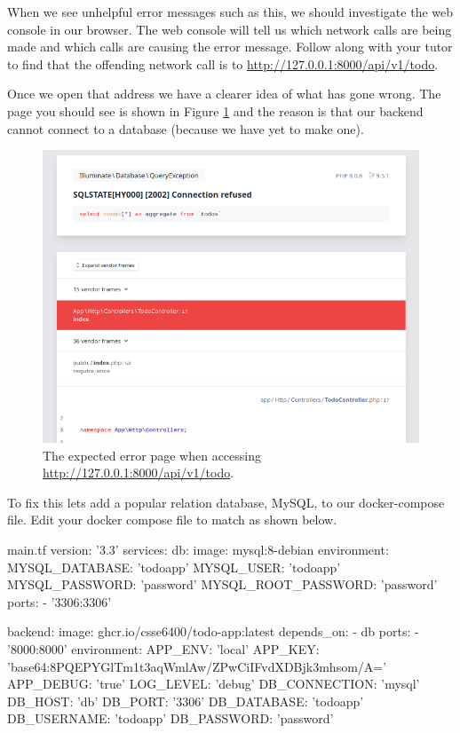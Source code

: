 \documentclass{csse4400}
\begin{document}
When we see unhelpful error messages such as this,
we should investigate the web console in our browser.
The web console will tell us which network calls are being made and which calls are causing the error message.
Follow along with your tutor to find that the offending network call is to \url{http://127.0.0.1:8000/api/v1/todo}.

Once we open that address we have a clearer idea of what has gone wrong.
The page you should see is shown in Figure \ref{fig:expected-error} and the reason is that our backend cannot connect to a database (because we have yet to make one).

\begin{figure}[H]
\includegraphics[width=\textwidth]{images/missing-db}
\caption{The expected error page when accessing \url{http://127.0.0.1:8000/api/v1/todo}.}
\label{fig:expected-error}
\end{figure}

To fix this lets add a popular relation database, MySQL, to our docker-compose file.
Edit your docker compose file to match as shown below.

\begin{code}[language=docker-compose]{main.tf}
version: '3.3'
services:
  db:
    image: mysql:8-debian
    environment:
      MYSQL_DATABASE: 'todoapp'
      MYSQL_USER: 'todoapp'
      MYSQL_PASSWORD: 'password'
      MYSQL_ROOT_PASSWORD: 'password'
    ports:
      - '3306:3306'

  backend:
    image: ghcr.io/csse6400/todo-app:latest
    depends_on:
      - db
    ports:
      - '8000:8000'
    environment:
      APP_ENV: 'local'
      APP_KEY: 'base64:8PQEPYGlTm1t3aqWmlAw/ZPwCiIFvdXDBjk3mhsom/A='
      APP_DEBUG: 'true'
      LOG_LEVEL: 'debug'
      DB_CONNECTION: 'mysql'
      DB_HOST: 'db'
      DB_PORT: '3306'
      DB_DATABASE: 'todoapp'
      DB_USERNAME: 'todoapp'
      DB_PASSWORD: 'password'
\end{code}
\end{document}
